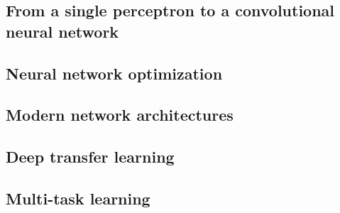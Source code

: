 \subsection{From a single perceptron to a convolutional neural network}

\subsection{Neural network optimization}

\subsection{Modern network architectures}

\subsection{Deep transfer learning}

\subsection{Multi-task learning}

